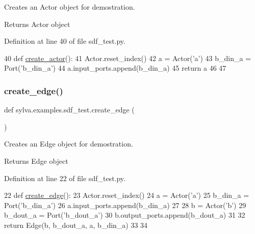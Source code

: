 Creates an Actor object for demostration. 

\begin{DoxyReturn}{Returns}
Actor object 
\end{DoxyReturn}


Definition at line 40 of file sdf\+\_\+test.\+py.


\begin{DoxyCode}
40 \textcolor{keyword}{def }\hyperlink{namespacesylva_1_1examples_1_1sdf__test_a76589ddbcc30881033648fc0cf368f7e}{create\_actor}():
41     Actor.reset\_index()
42     a = Actor(\textcolor{stringliteral}{'a'})
43     b\_din\_a = Port(\textcolor{stringliteral}{'b\_din\_a'})
44     a.input\_ports.append(b\_din\_a)
45     \textcolor{keywordflow}{return} a
46 
47 
\end{DoxyCode}
\mbox{\label{namespacesylva_1_1examples_1_1sdf__test_a58de2de4ff42625dbc8abfbf7c06f34e}} 
\subsubsection{\texorpdfstring{create\+\_\+edge()}{create\_edge()}}
{\footnotesize\ttfamily def sylva.\+examples.\+sdf\+\_\+test.\+create\+\_\+edge (\begin{DoxyParamCaption}{ }\end{DoxyParamCaption})}



Creates an Edge object for demostration. 

\begin{DoxyReturn}{Returns}
Edge object 
\end{DoxyReturn}


Definition at line 22 of file sdf\+\_\+test.\+py.


\begin{DoxyCode}
22 \textcolor{keyword}{def }\hyperlink{namespacesylva_1_1examples_1_1sdf__test_a58de2de4ff42625dbc8abfbf7c06f34e}{create\_edge}():
23     Actor.reset\_index()
24     a = Actor(\textcolor{stringliteral}{'a'})
25     b\_din\_a = Port(\textcolor{stringliteral}{'b\_din\_a'})
26     a.input\_ports.append(b\_din\_a)
27 
28     b = Actor(\textcolor{stringliteral}{'b'})
29     b\_dout\_a = Port(\textcolor{stringliteral}{'b\_dout\_a'})
30     b.output\_ports.append(b\_dout\_a)
31 
32     \textcolor{keywordflow}{return} Edge(b, b\_dout\_a, a, b\_din\_a)
33 
34 
\end{DoxyCode}


